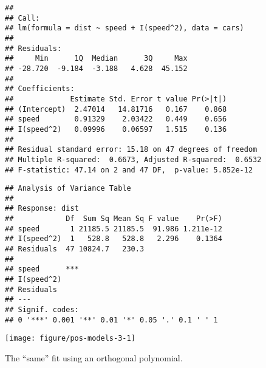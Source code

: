 \documentclass[paper=a4,10pt,div=17,headsepline,BCOR=12mm,twoside,open=right]{scrbook}\usepackage{knitr}
\begin{document}
\begin{knitrout}\footnotesize
{}\color{fgcolor}\begin{kframe}
\begin{alltt}
 \hlkwb{<-}  \hlopt{~}  \hlopt{+} \hlopt{^}\hlstd{),}  
  \hlstd{=} \hlstd{)} 
 
\end{alltt}
\begin{verbatim}
## 
## Call:
## lm(formula = dist ~ speed + I(speed^2), data = cars)
## 
## Residuals:
##     Min      1Q  Median      3Q     Max 
## -28.720  -9.184  -3.188   4.628  45.152 
## 
## Coefficients:
##             Estimate Std. Error t value Pr(>|t|)
## (Intercept)  2.47014   14.81716   0.167    0.868
## speed        0.91329    2.03422   0.449    0.656
## I(speed^2)   0.09996    0.06597   1.515    0.136
## 
## Residual standard error: 15.18 on 47 degrees of freedom
## Multiple R-squared:  0.6673,	Adjusted R-squared:  0.6532 
## F-statistic: 47.14 on 2 and 47 DF,  p-value: 5.852e-12
\end{verbatim}
\begin{alltt}
 
\end{alltt}
\begin{verbatim}
## Analysis of Variance Table
## 
## Response: dist
##            Df  Sum Sq Mean Sq F value    Pr(>F)
## speed       1 21185.5 21185.5  91.986 1.211e-12
## I(speed^2)  1   528.8   528.8   2.296    0.1364
## Residuals  47 10824.7   230.3                  
##               
## speed      ***
## I(speed^2)    
## Residuals     
## ---
## Signif. codes:  
## 0 '***' 0.001 '**' 0.01 '*' 0.05 '.' 0.1 ' ' 1
\end{verbatim}
\end{kframe}

{\centering \texttt{[image: figure/pos-models-3-1]} 

}



\end{knitrout}

The ``same'' fit using an orthogonal polynomial.
\end{document}
